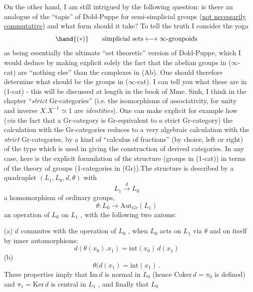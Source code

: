 On the other hand, I am still intrigued by the following question: is
there an analogue of the ``tapis'' of Dold-Puppe for semi-simplicial groups (\uline{not
necessarily commutative}) and what form should it take? To tell the truth I
consider the yoga
\[ \hand{(*)} \qquad \text{simplicial sets} \longleftrightarrow \infty\text{-groupoids} \]
as being essentially the ultimate ``set theoretic'' version of Dold-Puppe, which
I would deduce  by making explicit solely the fact that the abelian groups in
($\infty$-cat) are ``nothing else'' than the  complexes  in (Ab). One should
therefore  determine what should be the groups in ($\infty$-cat). I can tell you
what these are in (1-cat) - this will be discussed at length in the book of
Mme. Sinh, I think in the chapter ``\emph{strict} Gr-categories'' (i.e. the isomorphisms
of associativity, for unity and inverse $X.X^{-1} \simeq 1$ are \emph{identities}). One can
make explicit for example how (\emph{via} the fact that a Gr-category is Gr-equivalent
to a strict Gr-category) the calculation with the Gr-categories reduces to a
very algebraic calculation with the \emph{strict} Gr-categories, by a kind of
``calculus of fractions'' (by choice, left or right) of the type which is used
in giving the construction of derived categories. In any case, here is the
explicit formulation of the structure (groups in (1-cat)) in terms of the
theory of groups (1-categories in (Gr)).The structure is described by a
quadruplet $(L_1, L_0, d, \theta)$ with
\[ L_1 \xrightarrow{d} L_0 \]
a homomorphism of ordinary groups,
\[ \theta : L_0 \longrightarrow \mathrm{Aut}_{Gr}(L_1) \]
an operation of $L_0$ on $L_1$ , with the following two axioms:

(a) $d$ commutes with the operation of $L_0$ , when $L_0$ acts on $L_1$
via $\theta$ and on itself by inner automorphisms:
\[ d(\theta(x_0).x_1) = \mathrm{int}(x_0)\, d(x_1) \]
(b) \[ \theta(d(x_1) = \mathrm{int}(x_1) \ . \]
These properties imply that $\mathrm{Im}\, d$ is normal in $L_0$\over{,}{\unsure{;}} (hence $\mathrm{Coker}\, d = \pi_0$
is defined) and $\pi_1 = \mathrm{Ker}\, d$ is central in $L_1$ , and finally that $L_0$

